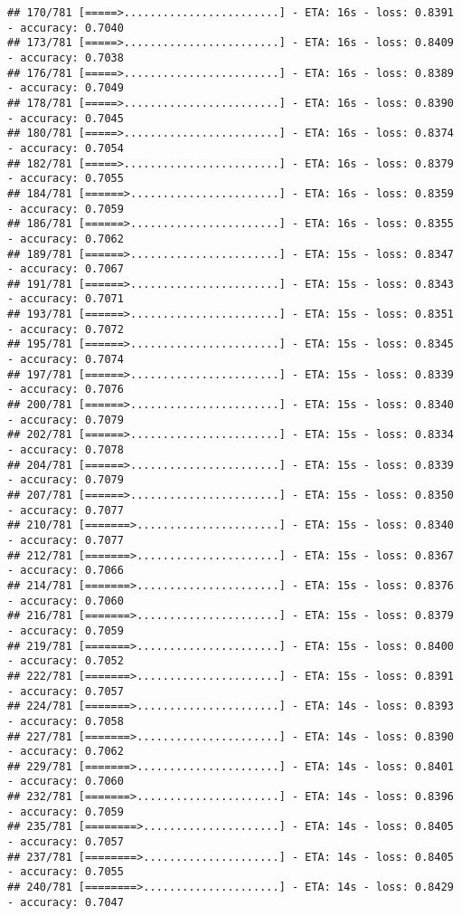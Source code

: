 \documentclass[
]{article}
\begin{document}
\begin{verbatim}
## 170/781 [=====>........................] - ETA: 16s - loss: 0.8391 - accuracy: 0.7040
## 173/781 [=====>........................] - ETA: 16s - loss: 0.8409 - accuracy: 0.7038
## 176/781 [=====>........................] - ETA: 16s - loss: 0.8389 - accuracy: 0.7049
## 178/781 [=====>........................] - ETA: 16s - loss: 0.8390 - accuracy: 0.7045
## 180/781 [=====>........................] - ETA: 16s - loss: 0.8374 - accuracy: 0.7054
## 182/781 [=====>........................] - ETA: 16s - loss: 0.8379 - accuracy: 0.7055
## 184/781 [======>.......................] - ETA: 16s - loss: 0.8359 - accuracy: 0.7059
## 186/781 [======>.......................] - ETA: 16s - loss: 0.8355 - accuracy: 0.7062
## 189/781 [======>.......................] - ETA: 15s - loss: 0.8347 - accuracy: 0.7067
## 191/781 [======>.......................] - ETA: 15s - loss: 0.8343 - accuracy: 0.7071
## 193/781 [======>.......................] - ETA: 15s - loss: 0.8351 - accuracy: 0.7072
## 195/781 [======>.......................] - ETA: 15s - loss: 0.8345 - accuracy: 0.7074
## 197/781 [======>.......................] - ETA: 15s - loss: 0.8339 - accuracy: 0.7076
## 200/781 [======>.......................] - ETA: 15s - loss: 0.8340 - accuracy: 0.7079
## 202/781 [======>.......................] - ETA: 15s - loss: 0.8334 - accuracy: 0.7078
## 204/781 [======>.......................] - ETA: 15s - loss: 0.8339 - accuracy: 0.7079
## 207/781 [======>.......................] - ETA: 15s - loss: 0.8350 - accuracy: 0.7077
## 210/781 [=======>......................] - ETA: 15s - loss: 0.8340 - accuracy: 0.7077
## 212/781 [=======>......................] - ETA: 15s - loss: 0.8367 - accuracy: 0.7066
## 214/781 [=======>......................] - ETA: 15s - loss: 0.8376 - accuracy: 0.7060
## 216/781 [=======>......................] - ETA: 15s - loss: 0.8379 - accuracy: 0.7059
## 219/781 [=======>......................] - ETA: 15s - loss: 0.8400 - accuracy: 0.7052
## 222/781 [=======>......................] - ETA: 15s - loss: 0.8391 - accuracy: 0.7057
## 224/781 [=======>......................] - ETA: 14s - loss: 0.8393 - accuracy: 0.7058
## 227/781 [=======>......................] - ETA: 14s - loss: 0.8390 - accuracy: 0.7062
## 229/781 [=======>......................] - ETA: 14s - loss: 0.8401 - accuracy: 0.7060
## 232/781 [=======>......................] - ETA: 14s - loss: 0.8396 - accuracy: 0.7059
## 235/781 [========>.....................] - ETA: 14s - loss: 0.8405 - accuracy: 0.7057
## 237/781 [========>.....................] - ETA: 14s - loss: 0.8405 - accuracy: 0.7055
## 240/781 [========>.....................] - ETA: 14s - loss: 0.8429 - accuracy: 0.7047

\end{verbatim}
\end{document}
